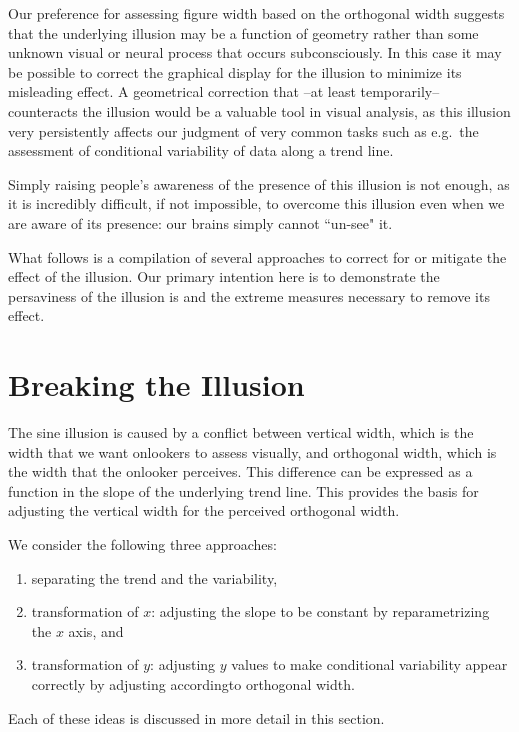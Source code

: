 \documentclass[11pt]{isuthesis}\usepackage[]{graphicx}\usepackage[]{color}
\begin{document}
Our preference for assessing figure width based on the orthogonal width suggests that the underlying illusion may be a function of geometry rather than some unknown visual or neural process that occurs subconsciously. In this  case it may be  possible to correct the graphical display for the illusion to minimize its misleading effect. A geometrical correction that  --at least temporarily-- counteracts the illusion would be a valuable tool in visual analysis, as this illusion very persistently affects our judgment of very common tasks  such as e.g.~the assessment of conditional variability of data along a trend line.

Simply raising people's awareness of the presence of this illusion is not enough,
as it is incredibly difficult, if not impossible, to overcome this illusion even when we are aware of its presence: our brains simply cannot ``un-see" it. 

What follows is a compilation of several approaches to correct for or mitigate the effect of the illusion. Our primary intention here is to demonstrate the persaviness of the illusion is and the extreme measures necessary to remove its effect. 

\section{Breaking the Illusion}
The sine  illusion is caused by a conflict between vertical width, which is the width that we want onlookers to assess visually, and orthogonal width, which is the width that the onlooker perceives. This difference can be expressed as a function in the slope of the underlying trend line. This provides the basis for adjusting the vertical width for the perceived orthogonal width. 

We consider the following three approaches:  
\begin{enumerate}
\item separating the trend and the variability, 
\item transformation of $x$: adjusting the slope to be constant by reparametrizing the $x$ axis, and
\item transformation of $y$: adjusting $y$ values to make conditional variability  appear correctly by adjusting accordingto orthogonal width. 
\end{enumerate}
Each of these ideas is discussed in more detail in this section.
\end{document}
